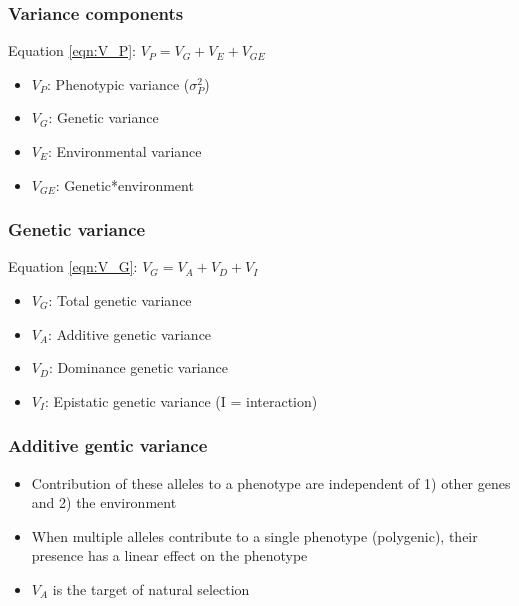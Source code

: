 \begin{frame}
\frametitle{Variance components}
\begin{block}{Equation \ref{eqn:V_P}: $V_P = V_G + V_E + V_{GE}$}
\begin{itemize}
\item{$V_P$: Phenotypic variance ($\sigma^2_P$)}
\item{$V_G$: Genetic variance}
\item{$V_E$: Environmental variance}
\item{$V_{GE}$: Genetic*environment}
\end{itemize}
\end{block}
\end{frame}

\begin{frame}
\frametitle{Genetic variance}
\begin{block}{Equation \ref{eqn:V_G}: $V_G = V_A + V_D + V_I$}
\begin{itemize}
\item{$V_G$: Total genetic variance}
\item{$V_A$: Additive genetic variance}
\item{$V_D$: Dominance genetic variance}
\item{$V_I$: Epistatic genetic variance (I = interaction)}
\end{itemize}
\end{block}
\end{frame}

\begin{frame}
\frametitle{Additive gentic variance}
\begin{block}{}
\begin{itemize}
\item{Contribution of these alleles to a phenotype are independent of 1) other
genes and 2) the environment}
\item{When multiple alleles contribute to a single phenotype (polygenic), their
presence has a linear effect on the phenotype}
\item{$V_A$ is the target of natural selection}
\end{itemize}
\end{block}{}
\end{frame}

